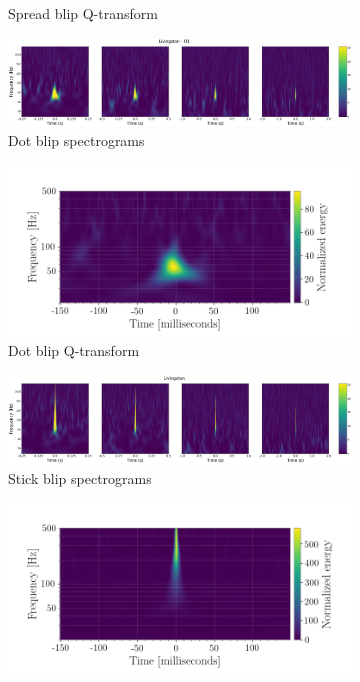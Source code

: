 \documentclass[a4paper]{article}
\begin{document}
\begin{figure}[h!]
\begin{subfigure}[t]{.29\textwidth}
		\caption{Spread blip Q-transform}
		\label{fig:spread_q}
	\end{subfigure}
	\begin{subfigure}[t]{.7\textwidth}
		\centering
		\includegraphics[width=.9\linewidth]{dot_blip_spect}
		\caption{Dot blip spectrograms}
		\label{fig:dot_s}
	\end{subfigure}
	\begin{subfigure}[t]{.29\textwidth}
		\centering
		\includegraphics[width=1.1\linewidth]{dot_blip2}
		\caption{Dot blip Q-transform}
		\label{fig:dot_q}
	\end{subfigure}
	\begin{subfigure}[t]{.7\textwidth}
		\centering
		\includegraphics[width=.9\linewidth]{stick_blip_spect}
		\caption{Stick blip spectrograms}
		\label{fig:stick_s}
	\end{subfigure}
	\begin{subfigure}[t]{.29\textwidth}
		\centering
		\includegraphics[width=1.1\linewidth]{stick_blip2}

\end{subfigure}
\end{figure}
\end{document}
